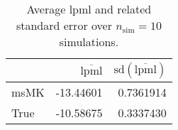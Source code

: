 \begin{table}[H]

\caption{Average lpml and related standard error over $n_{\text{sim}} = 10$ simulations.}
\centering
\begin{tabular}[t]{lrr}
\toprule
  & $\overbar{\text{lpml}}$ & $\text{sd}(\overbar{\text{lpml}})$\\
\midrule
msMK & -13.44601 & 0.7361914\\
True & -10.58675 & 0.3337430\\
\bottomrule
\end{tabular}
\end{table}